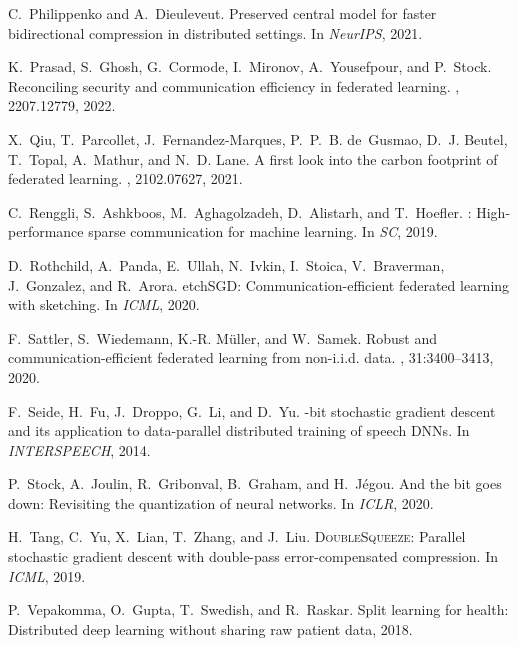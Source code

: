 \documentclass[11pt]{article}
\begin{document}
\begin{thebibliography}{10}
\begin{small}
C.~Philippenko and A.~Dieuleveut.
\newblock Preserved central model for faster bidirectional compression in
  distributed settings.
\newblock In {\em NeurIPS}, 2021.

K.~Prasad, S.~Ghosh, G.~Cormode, I.~Mironov, A.~Yousefpour, and P.~Stock.
\newblock Reconciling security and communication efficiency in federated
  learning.
, 2207.12779, 2022.

X.~Qiu, T.~Parcollet, J.~Fernandez-Marques, P.~P.~B. de~Gusmao, D.~J. Beutel,
  T.~Topal, A.~Mathur, and N.~D. Lane.
\newblock A first look into the carbon footprint of federated learning.
, 2102.07627, 2021.

C.~Renggli, S.~Ashkboos, M.~Aghagolzadeh, D.~Alistarh, and T.~Hoefler.
: High-performance sparse communication for machine
  learning.
\newblock In {\em SC}, 2019.

D.~Rothchild, A.~Panda, E.~Ullah, N.~Ivkin, I.~Stoica, V.~Braverman,
  J.~Gonzalez, and R.~Arora.
etch{SGD}: Communication-efficient federated learning with
  sketching.
\newblock In {\em ICML}, 2020.

F.~Sattler, S.~Wiedemann, K.-R. M{\"u}ller, and W.~Samek.
\newblock Robust and communication-efficient federated learning from
  non-{i.i.d.} data.
,
  31:3400--3413, 2020.

F.~Seide, H.~Fu, J.~Droppo, G.~Li, and D.~Yu.
-bit stochastic gradient descent and its application to
  data-parallel distributed training of speech {DNNs}.
\newblock In {\em {INTERSPEECH}}, 2014.

P.~Stock, A.~Joulin, R.~Gribonval, B.~Graham, and H.~Jégou.
\newblock And the bit goes down: Revisiting the quantization of neural
  networks.
\newblock In {\em ICLR}, 2020.

H.~Tang, C.~Yu, X.~Lian, T.~Zhang, and J.~Liu.
\newblock \textsc{DoubleSqueeze}: Parallel stochastic gradient descent with
  double-pass error-compensated compression.
\newblock In {\em ICML}, 2019.

P.~Vepakomma, O.~Gupta, T.~Swedish, and R.~Raskar.
\newblock Split learning for health: Distributed deep learning without sharing
  raw patient data, 2018.


\end{small}
\end{thebibliography}
\end{document}
